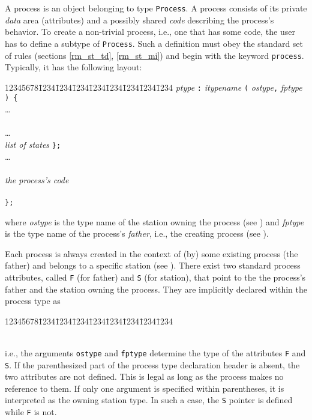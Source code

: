 A process is an object belonging to type {\tt Process}.
A process consists of its private {\em data\/} area (attributes)
and a possibly shared
{\em code\/} describing the process's behavior.
To create a non-trivial process, i.e., one that has some code, the user
has to define a subtype of {\tt Process}.
Such a definition must obey the standard set of rules (sections
\ref{rm_st_td}, \ref{rm_st_mi}) and begin with the keyword
{\tt process}.
Typically, it has the following layout:
{\tt\begin{tabbing}
12345678\=1234\=1234\=1234\=1234\=1234\=1234\=1234\=1234\kill
{} {\em ptype\/} {\tt :} {\em itypename\/} {\tt (} {\em ostype}{\tt ,} {\em fptype\/} {\tt ) \{} \\
\> \>\ldots \\
\>  \\
\> \>\ldots \\
\>  {\em list of states\/} {\tt \};} \\
\> \>\ldots \\
\>  \\
\> \> \> {\em the process's code} \\
\> \>{\tt \};} \\
\> {\tt \};}
\end{tabbing}}
\noindent
where {\em ostype\/}
is the type name of the station owning the process (see )
and {\em fptype\/}
is the type name of the process's {\em father}, i.e., the creating process
(see ).

Each process is always created in the context of (by) some existing process
(the father) and belongs to a specific station (see ).
There exist two standard process attributes, called
{\tt F} (for father) and {\tt S} (for station), that point to the
the process's father and the station owning the process.
They are implicitly declared within the process type as
{\tt\begin{tabbing}
12345678\=1234\=1234\=1234\=1234\=1234\=1234\=1234\=1234\kill
{}\>\\
\>\\
\end{tabbing}}
\noindent
i.e., the arguments {\tt ostype} and {\tt fptype}
determine the type of the attributes {\tt F} and {\tt S}.
If the parenthesized part of the process type
declaration header is absent, the two attributes are not defined.
This is legal as long as the process makes no reference to them.
If only one argument is specified within parentheses, it is interpreted as
the owning station type.
In such a case, the {\tt S} pointer is defined while {\tt F} is not.


